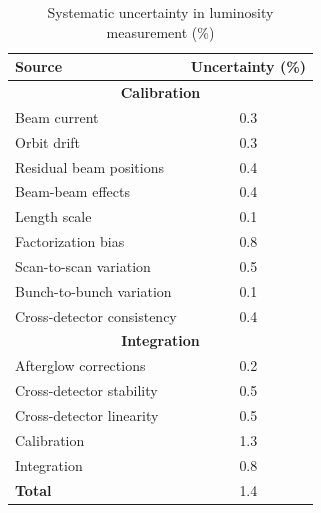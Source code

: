 \begin{table}[H]
  \centering
  \caption{Systematic uncertainty in luminosity measurement (\%)}
    \begin{tabular}{l|c}
        \textbf{Source} & \textbf{Uncertainty (\%)} \\
        \hline
        \multicolumn{2}{c}{\textbf{Calibration}} \\
        \hline
        Beam current & 0.3 \\
        Orbit drift & 0.3 \\
        Residual beam positions & 0.4 \\
        Beam-beam effects & 0.4 \\
        Length scale & 0.1 \\
        Factorization bias & 0.8 \\
        Scan-to-scan variation & 0.5 \\
        Bunch-to-bunch variation & 0.1 \\
        Cross-detector consistency & 0.4 \\
        \hline
        \multicolumn{2}{c}{\textbf{Integration}} \\
        \hline
        Afterglow corrections & 0.2 \\
        Cross-detector stability & 0.5 \\
        Cross-detector linearity & 0.5 \\
        \hline
        Calibration & 1.3 \\
        Integration & 0.8 \\
        \hline
        \textbf{Total} & 1.4 \\
    \end{tabular}
    \label{table:correction_uncertainties}
\end{table}


